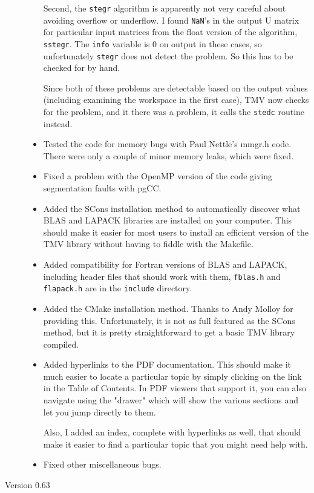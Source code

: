 \documentclass[twoside,letterpaper,11pt]{article}
\renewcommand{\tt}[1]{{\lstinline {#1}}}
\begin{document}
\begin{description}
\begin{itemize}
Second, the \tt{stegr} algorithm is apparently not very careful about avoiding overflow or underflow.
I found \tt{NaN}'s in the output U matrix for particular input matrices from the float version
of the algorithm, \tt{sstegr}.  The \tt{info} variable is 0 on output in these cases, so unfortunately
\tt{stegr} does not detect the problem.  So this has to be checked for by hand.

Since both of these problems are detectable based on the output values (including examining
the workspace in the first case), TMV now checks for the problem, and it there was a problem,
it calls the \tt{stedc} routine instead.
\item
Tested the code for memory bugs with Paul Nettle's mmgr.h code.  There were only a couple of 
minor memory leaks, which were fixed.
\item
Fixed a problem with the OpenMP version of the code giving segmentation faults with pgCC.
\item
Added the SCons installation method to automatically discover what BLAS and LAPACK libraries 
are installed on your computer.  This should make it easier for most users to install an efficient
version of the TMV library without having to fiddle with the Makefile.
\item
Added compatibility for Fortran versions of BLAS and LAPACK, including header files that
should work with them, \texttt{fblas.h} and \texttt{flapack.h} are in the \texttt{include} directory.
\item
Added the CMake installation method.  Thanks to Andy Molloy for providing this.  Unfortunately,
it is not as full featured as the SCons method, but it is pretty straightforward to get
a basic TMV library compiled.
\item
Added hyperlinks to the PDF documentation.  This should make it much easier to locate a particular topic by simply clicking on the link in the Table of Contents.  In PDF viewers that support it, you can 
also navigate using the "drawer" which will show the various sections and let you jump directly to them.

Also, I added an index, complete with hyperlinks as well, that should make it easier to find a particular topic that you might need help with.
\item
Fixed other miscellaneous bugs.

\end{itemize}

\item[Version 0.63]


\end{description}
\end{document}
